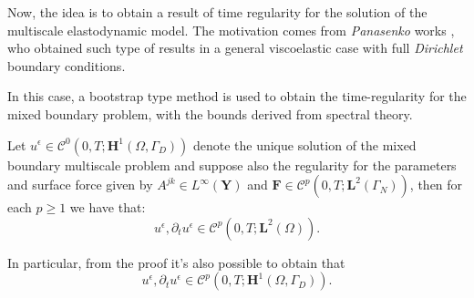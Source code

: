 
Now, the idea is to obtain a result of time regularity for the solution of the multiscale elastodynamic model. The motivation comes from \textit{Panasenko} works \cite{panasenko2005multi-scale}, who obtained such type of results in a general viscoelastic case with full \textit{Dirichlet} boundary conditions.

In this case, a bootstrap type method is used to obtain the time-regularity for the mixed boundary problem, with the bounds derived from spectral theory.

\begin{prop}
\label{BootstrapingProp}
Let $u^{\epsilon} \in \mathcal{C}^{0}(0,T; \mathbf{H}^1(\Omega, \Gamma_D))$ denote the unique solution of the mixed boundary multiscale problem and suppose also the regularity for the parameters and surface force given by $A^{jk} \in L^{\infty}(\mathbf{Y})$ and $\mathbf{F} \in \mathcal{C}^p(0,T; \mathbf{L}^{2}(\Gamma_N))$, then for each $p \geq 1$ we have that:
\begin{equation*}
    u^{\epsilon}, \partial_t u^{\epsilon} \in \mathcal{C}^p(0,T; \mathbf{L}^2(\Omega)).
\end{equation*}
\end{prop}
\begin{rem}
In particular, from the proof it's also possible to obtain that
\begin{equation*}
    u^{\epsilon}, \partial_t u^{\epsilon} \in \mathcal{C}^p(0,T; \mathbf{H}^1(\Omega, \Gamma_D)).
\end{equation*}
\end{rem}

